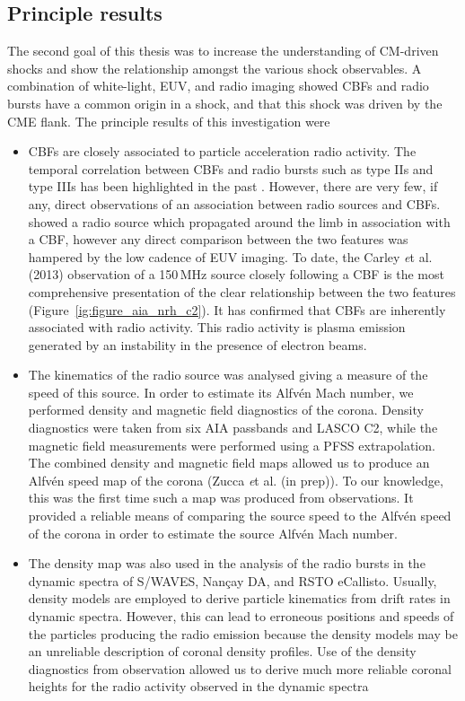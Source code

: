 \subsection{Principle results}
The second goal of this thesis was to increase the understanding of CM-driven shocks and show the relationship amongst the various shock observables. A combination of white-light, EUV, and radio imaging showed CBFs and radio bursts have a common origin in a shock, and that this shock was driven by the CME flank. The principle results of this investigation were
\begin{itemize}
\item CBFs are closely associated to particle acceleration radio activity. The temporal correlation between CBFs and radio bursts such as type IIs and type IIIs has been highlighted in the past \citep{klassen2000, maia2004}. However, there are very few, if any, direct observations of an association between radio sources and CBFs. \citet{vrsnak2005a} showed a radio source which propagated around the limb in association with a CBF, however any direct comparison between the two features was hampered by the low cadence of EUV imaging. To date, the Carley {\emph et al.} (2013) observation of a 150\,MHz source closely following a CBF is the most comprehensive presentation of the clear relationship between the two features (Figure~\ref{ig:figure_aia_nrh_c2}). It has confirmed that CBFs are inherently associated with radio activity. This radio activity is plasma emission generated by an instability in the presence of electron beams.
\item The kinematics of the radio source was analysed giving a measure of the speed of this source. In order to estimate its Alfv\'{e}n Mach number, we performed density and magnetic field diagnostics of the corona. Density diagnostics were taken from six AIA passbands and LASCO C2, while the magnetic field measurements were performed using a PFSS extrapolation. The combined density and magnetic field maps allowed us to produce an Alfv\'{e}n speed map of the corona (Zucca {\emph et al.} (in prep)). To our knowledge, this was the first time such a map was produced from observations. It provided a reliable means of comparing the source speed to the Alfv\'{e}n speed of the corona in order to estimate the source Alfv\'{e}n Mach number.
\item The density map was also used in the analysis of the radio bursts in the dynamic spectra of S/WAVES, Nan\c{c}ay DA, and RSTO eCallisto. Usually, density models are employed to derive particle kinematics from drift rates in dynamic spectra. However, this can lead to erroneous positions and speeds of the particles producing the radio emission because the density models may be an unreliable description of coronal density profiles. Use of the density diagnostics from observation allowed us to derive much more reliable coronal heights for the radio activity observed in the dynamic spectra

\end{itemize}
